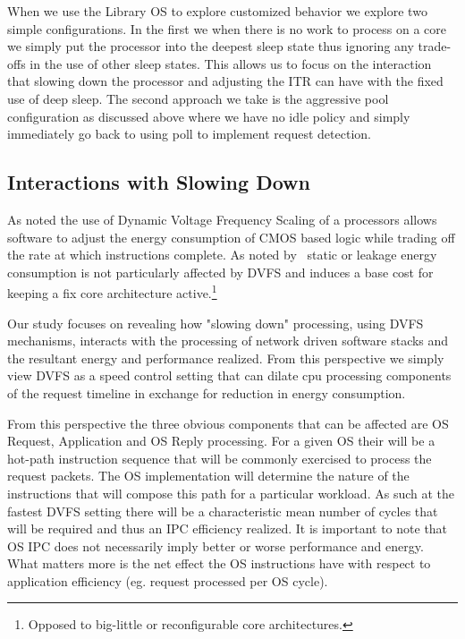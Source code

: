 When we use the Library OS to explore customized behavior we explore two simple configurations.  In the first we when there is no work to process on a core we simply put the processor into the deepest sleep state thus ignoring any trade-offs in the use of other sleep states.   This allows us to focus on the interaction that slowing down the processor and adjusting the ITR can have with the fixed use of deep sleep.   The second approach we take is the aggressive pool configuration as discussed above where we have no idle policy and simply immediately go back to using poll to implement request detection.

\subsection{Interactions with Slowing Down}
\label{sec:workflow:dvfs}

As noted the use of Dynamic Voltage Frequency Scaling of a processors allows software to adjust the energy consumption of CMOS based logic while trading off the rate at which instructions complete.  As noted by~\cite{slowdownorsleep, 10.1109/40.888701, pacingtoidle, udpm} static or leakage energy consumption is not particularly affected by DVFS and induces a base cost for keeping a fix core architecture active.\footnote{Opposed to big-little or reconfigurable core architectures.}

Our study focuses on revealing how "slowing down" processing, using DVFS mechanisms, interacts with the processing of network driven software stacks and the resultant energy and performance realized. From this perspective we simply view DVFS as a speed control setting that can dilate cpu processing components of the request timeline in exchange for reduction in energy consumption.

From this perspective the three obvious components that can be affected are OS Request, Application and OS Reply processing. For a given OS their will be a hot-path instruction sequence that will be commonly exercised to process the request packets.  The OS implementation will determine the nature of the instructions that will compose this path for a particular workload.  As such at the fastest DVFS setting there will be a characteristic mean number of cycles that will be required and thus an IPC efficiency realized.  It is important to note that OS IPC does not necessarily imply better or worse performance and energy. What matters more is the net effect the OS instructions have with respect to application efficiency (eg. request processed per OS cycle). 

